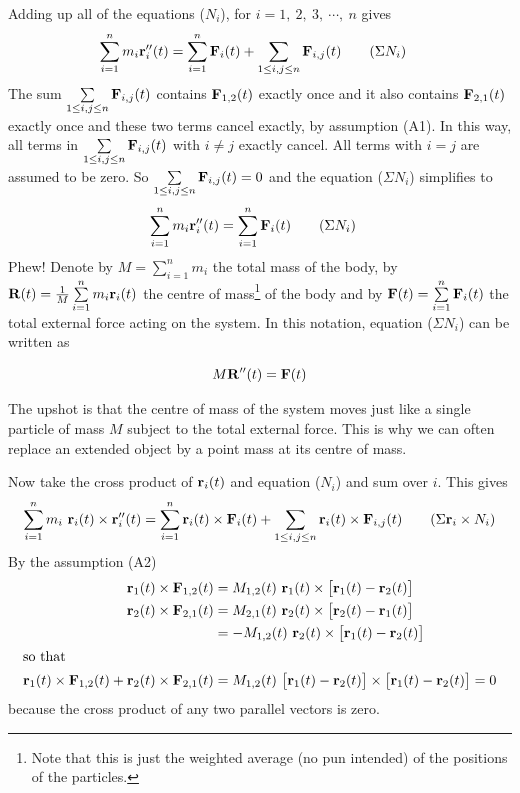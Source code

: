 Adding up all of the equations ($N_i$), 
for $i=1,\ 2,\ 3,\ \cdots,\ n$ gives
\begin{align}
\sum_{i=1}^n m_i \mathbf{r}''_i(t)&= \sum_{i=1}^n \mathbf{F}_i(t)+\sum_{1\le i,j\le n} \mathbf{F}_{i,j}(t)
\tag{$\Sigma N_i$}\end{align}
The sum $\sum\limits_{1\le i,j\le n} \mathbf{F}_{i,j}(t)$ contains $\mathbf{F}_{1,2}(t)$
exactly once and it also contains $\mathbf{F}_{2,1}(t)$ exactly once and these two
terms cancel exactly, by assumption (A1). In this way, all terms in 
$\sum\limits_{1\le i,j\le n} \mathbf{F}_{i,j}(t)$
with $i\ne j$ exactly cancel. All terms with $i=j$ are assumed to be zero.
So $\sum\limits_{1\le i,j\le n} \mathbf{F}_{i,j}(t)=0$ and the equation 
($\Sigma N_i$) simplifies to
\begin{align}
\sum_{i=1}^n m_i \mathbf{r}''_i(t)&= \sum_{i=1}^n \mathbf{F}_i(t)
\tag{$\Sigma N_i$}\end{align}
Phew! Denote by $M=\sum\limits_{i=1}^n m_i$ the total mass of the body,
by $\mathbf{R}(t)=\frac{1}{M}\sum\limits_{i=1}^n m_i\mathbf{r}_i(t)$  the centre of 
mass\footnote{Note that this is just the weighted average (no pun intended)
of the positions of the particles.} of the body and by 
$\mathbf{F}(t)=\sum\limits_{i=1}^n \mathbf{F}_i(t)$  the total external force acting
on the system. In this notation, equation ($\Sigma N_i$) can be written as
\begin{impeqn}\label{eqn:rigidCofM}
\begin{equation*}
M\mathbf{R}''(t)=\mathbf{F}(t)
\end{equation*}
\end{impeqn}
\noindent 
The upshot is that the centre of mass of the system moves just like 
a single particle of mass $M$ subject to the total external force.
This is why we can often replace an extended object by a point mass at its
centre of mass.

Now take the cross product of $\mathbf{r}_i(t)$ and equation ($N_i$) 
and sum over $i$. This gives
\begin{equation}
\sum_{i=1}^n m_i\ \vr_i(t)\times\vr''_i(t)
= \sum_{i=1}^n \vr_i(t)\times\vF_i(t)
+\sum_{1\le i,j\le n} \vr_i(t)\times\vF_{i,j}(t)
\tag{$\Sigma \vr_i\times N_i$}\end{equation}
By the assumption (A2)
\begin{align*}
\mathbf{r}_1(t)\times\mathbf{F}_{1,2}(t)
&=M_{1,2}(t)\ \mathbf{r}_1(t)\times\big[\mathbf{r}_1(t)-\mathbf{r}_2(t)\big]\\
\mathbf{r}_2(t)\times\mathbf{F}_{2,1}(t)
&=M_{2,1}(t)\ \mathbf{r}_2(t)\times\big[\mathbf{r}_2(t)-\mathbf{r}_1(t)\big]\\
&=-M_{1,2}(t)\ \mathbf{r}_2(t)\times\big[\mathbf{r}_1(t)-\mathbf{r}_2(t)\big]\\
\intertext{so that}
\mathbf{r}_1(t)\times\mathbf{F}_{1,2}(t)
+\mathbf{r}_2(t)\times\mathbf{F}_{2,1}(t)
&=M_{1,2}(t)\ \big[\mathbf{r}_1(t)-\mathbf{r}_2(t)\big]\times\big[\mathbf{r}_1(t)-\mathbf{r}_2(t)\big]
=0
\end{align*}
because the cross product of any two parallel vectors is zero.

